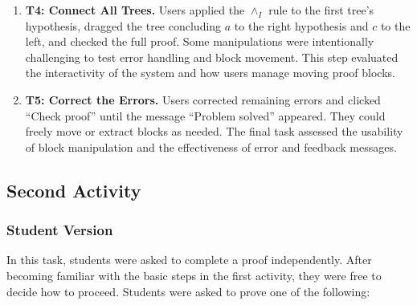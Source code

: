 \begin{enumerate}[label={}]
    \item \textbf{T4: Connect All Trees.} 
    Users applied the $\land_I$ rule to the first tree’s hypothesis, dragged the tree concluding $a$ to the right hypothesis and $c$ to the left, and checked the full proof. Some manipulations were intentionally challenging to test error handling and block movement. This step evaluated the interactivity of the system and how users manage moving proof blocks.  
    \begin{center}
    \end{center}

    \item \textbf{T5: Correct the Errors.} 
    Users corrected remaining errors and clicked ``Check proof'' until the message ``Problem solved'' appeared. They could freely move or extract blocks as needed.  
    The final task assessed the usability of block manipulation and the effectiveness of error and feedback messages.  
    \begin{center}
    \end{center}
\end{enumerate}

\subsection*{Second Activity}

\subsubsection*{Student Version}
In this task, students were asked to complete a proof independently. After becoming familiar with the basic steps in the first activity, they were free to decide how to proceed. Students were asked to prove one of the following:

